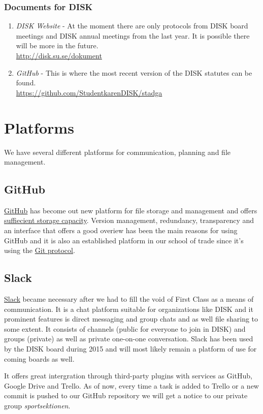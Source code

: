 \documentclass[12pt,a4paper]{article}
\begin{document}
		\subsubsection{Documents for DISK}
		\begin{enumerate}
			\item \emph{DISK Website} - At the moment there are only protocols from DISK board meetings and DISK annual meetings from the last year. It is possible there will be more in the future.\\
			\url{http://disk.su.se/dokument}
			\item \emph{GitHub} - This is where the most recent version of the DISK statutes can be found.\\
			\url{https://github.com/StudentkarenDISK/stadga}
		\end{enumerate}

	\section{Platforms}
		We have several different platforms for communication, planning and file management.
		\subsection{GitHub}
			\href{http://github.com}{GitHub} has become out new platform for file storage and management and offers \href{https://help.github.com/articles/what-is-my-disk-quota/}{suffiecient storage capacity}. Version management, redundancy, transparency and an interface that offers a good overiew has been the main reasons for using GitHub and it is also an established platform in our school of trade since it's using the \href{https://git-scm.com/videos}{Git protocol}.
		\subsection{Slack}
			\href{http://diskdsv.slack.com}{Slack} became necessary after we had to fill the void of First Class as a means of communication. It is a chat platform suitable for organizations like DISK and it prominent features is direct messaging and group chats and as well file sharing to some extent. It consists of channels (public for everyone to join in DISK) and groups (private) as well as private one-on-one conversation. Slack has been used by the DISK board during 2015 and will most likely remain a platform of use for coming boards as well.

			It offers great intergration through third-party plugins with services as GitHub, Google Drive and Trello. As of now, every time a task is added to Trello or a new commit is pushed to our GitHub repository we will get a notice to our private group \emph{sportsektionen}.
\end{document}
